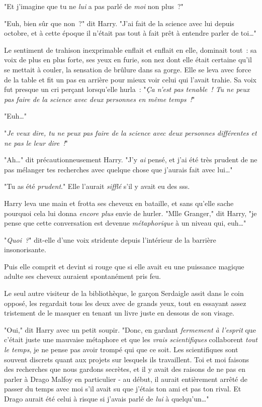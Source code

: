 "Et j'imagine que tu ne \emph{lui} a pas parlé de \emph{moi} non plus~?"

"Euh, bien sûr que non~?" dit Harry. "J'ai fait de la science avec lui depuis octobre, et à cette époque il n'était pas tout à fait prêt à entendre parler de toi…"

Le sentiment de trahison inexprimable enflait et enflait en elle, dominait tout~: sa voix de plus en plus forte, ses yeux en furie, son nez dont elle était certaine qu'il se mettait à couler, la sensation de brûlure dans sa gorge. Elle se leva avec force de la table et fit un pas en arrière pour mieux voir celui qui l'avait trahie. Sa voix fut presque un cri perçant lorsqu'elle hurla~: "\emph{Ça n'est pas tenable~! Tu ne peux pas faire de la science avec deux personnes en même temps~!}"

"Euh…"

"\emph{Je veux dire, tu ne peux pas faire de la science avec deux personnes différentes et ne pas le leur dire~!}"

"Ah…" dit précautionneusement Harry. "J'y \emph{ai} pensé, et j'ai été très prudent de ne pas mélanger tes recherches avec quelque chose que j'aurais fait avec lui…"

"Tu as été \emph{prudent}." Elle l'aurait \emph{sifflé} s'il y avait eu des sss.

Harry leva une main et frotta ses cheveux en bataille, et sans qu'elle sache pourquoi cela lui donna \emph{encore plus} envie de hurler. "Mlle Granger," dit Harry, "je pense que cette conversation est devenue \emph{métaphorique} à un niveau qui, euh…"

"\emph{Quoi~?}" dit-elle d'une voix stridente depuis l'intérieur de la barrière insonorisante.

Puis elle comprit et devint si rouge que si elle avait eu une puissance magique adulte ses cheveux auraient spontanément pris feu.

Le seul autre visiteur de la bibliothèque, le garçon Serdaigle assit dans le coin opposé, les regardait tous les deux avec de grands yeux, tout en essayant assez tristement de le masquer en tenant un livre juste en dessous de son visage.

"Oui," dit Harry avec un petit soupir. "Donc, en gardant \emph{fermement à l'esprit} que c'était juste une mauvaise métaphore et que les \emph{vrais scientifiques} collaborent \emph{tout le temps}, je ne pense pas avoir trompé qui que ce soit. Les scientifiques sont souvent discrets quant aux projets sur lesquels ils travaillent. Toi et moi faisons des recherches que nous gardons secrètes, et il y avait des raisons de ne pas en parler à Drago Malfoy en particulier - au début, il aurait entièrement arrêté de passer du temps avec moi s'il avait su que j'étais ton ami et pas ton rival. Et Drago aurait été celui à risque si j'avais parlé de \emph{lui} à quelqu'un…"

